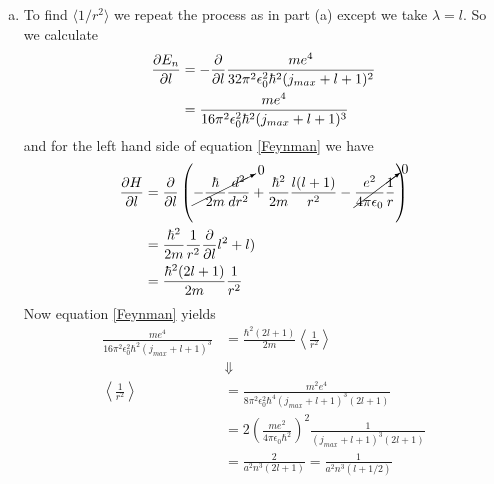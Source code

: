 \documentclass[11pt]{article}
\numberwithin{equation}{section}
\begin{document}
\begin{enumerate}[(a)]
\item
To find $\langle1/r^2\rangle$ we repeat the process as in part (a) except we take $\lambda = l$. So we calculate 
\begin{align*}
\frac{\partial{E_n}}{\partial{l}} &= -\frac{\partial{}}{\partial{l}}\frac{me^4}{32\pi^2\epsilon_0^2\hbar^2(j_{max}+l+1)^2}\\
&= \frac{me^4}{16\pi^2\epsilon_0^2\hbar^2(j_{max}+l+1)^3}
\end{align*}
and for the left hand side of equation \ref{Feynman} we have
\begin{align*}
\frac{\partial{H}}{\partial{l}} &= \frac{\partial{}}{\partial{l}}\left(\cancelto{0}{-\frac{\hbar}{2m}\frac{d^2}{dr^2}} + \frac{\hbar^2}{2m}\frac{l(l+1)}{r^2} - \cancelto{0}{\frac{e^2}{4\pi\epsilon_0}\frac{1}{r}}\right)\\
&= \frac{\hbar^2}{2m}\frac{1}{r^2}\frac{\partial{}}{\partial{l}}{l^2+l)}\\
&= \frac{\hbar^2(2l + 1)}{2m}\frac{1}{r^2}
\end{align*}
Now equation \ref{Feynman} yields
\begin{align*}
\frac{me^4}{16\pi^2\epsilon_0^2\hbar^2(j_{max}+l+1)^3} &= \frac{\hbar^2(2l + 1)}{2m}\left\langle\frac{1}{r^2}\right\rangle\\
&\Downarrow\\
\left\langle\frac{1}{r^2}\right\rangle &= \frac{m^2e^4}{8\pi^2\epsilon_0^2\hbar^4(j_{max}+l+1)^3(2l + 1)} \\
&= 2\left(\frac{me^2}{4\pi\epsilon_0\hbar^2}\right)^2\frac{1}{(j_{max}+l+1)^3(2l + 1)} \\
&= \frac{2}{a^2n^3(2l + 1)} = \frac{1}{a^2n^3(l + 1/2)}
\end{align*}
\end{enumerate}
\end{document}
